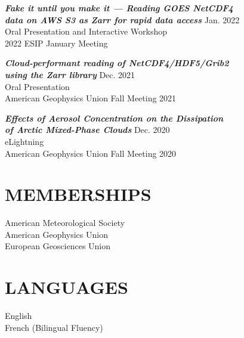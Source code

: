 \documentclass[overlapped]{res}
\begin{document}
\begin{resume}
                {\sl \textbf{Fake it until you make it — Reading GOES NetCDF4 \\ data on AWS S3 as Zarr for rapid data access }} \hfill Jan. 2022 \\
                Oral Presentation and Interactive Workshop\\
                2022 ESIP January Meeting

                {\sl \textbf{Cloud-performant reading of NetCDF4/HDF5/Grib2\\ using the Zarr library}} \hfill Dec. 2021 \\
                Oral Presentation \\
                American Geophysics Union Fall Meeting 2021

                {\sl \textbf{Effects of Aerosol Concentration  on the Dissipation \\ of Arctic Mixed-Phase Clouds}} \hfill Dec. 2020 \\ 
                eLightning \\
                American Geophysics Union Fall Meeting 2020
                

                

\section{MEMBERSHIPS}            
                {American Meteorological Society} \\
                {American Geophysics Union} \\
                {European Geosciences Union}

\section{LANGUAGES}
                English \\
                French (Bilingual Fluency)

\end{resume}
\end{document}
